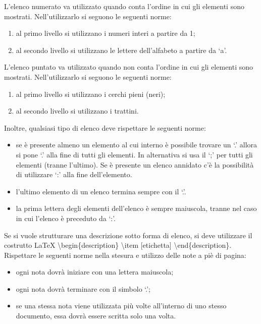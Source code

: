 					L’elenco numerato va utilizzato quando conta l’ordine in cui gli elementi sono mostrati. Nell’utilizzarlo si seguono le seguenti norme:
					\begin{enumerate}
						\item al primo livello si utilizzano i numeri interi a partire da 1;
						\item al secondo livello si utilizzano le lettere dell’alfabeto a partire da ‘a’.
					\end{enumerate}
					L’elenco puntato va utilizzato quando non conta l’ordine in cui gli elementi sono mostrati. Nell’utilizzarlo si seguono le seguenti norme:
					\begin{enumerate}
						\item al primo livello si utilizzano i cerchi pieni (neri);
						\item al secondo livello si utilizzano i trattini.
					\end{enumerate}
					Inoltre, qualsiasi tipo di elenco deve rispettare le seguenti norme:
					\begin{itemize}
						\item se è presente almeno un elemento al cui interno è possibile trovare un ‘.’ allora si pone ‘.’ alla fine di tutti gli elementi. In alternativa si usa il ‘;’ per tutti gli elementi (tranne l’ultimo). Se è presente un elenco annidato c’è la possibilità di utilizzare ‘:’ alla fine dell’elemento.
						\item l’ultimo elemento di un elenco termina sempre con il ‘.’.
						\item la prima lettera degli elementi dell’elenco è sempre maiuscola, tranne nel caso in cui l’elenco è preceduto da ‘:’.
					\end{itemize}
					Se si vuole strutturare una descrizione sotto forma di elenco, si deve utilizzare il costrutto \LaTeX{} \textbackslash begin\{description\} \textbackslash item [etichetta] \textbackslash end\{description\}.
					Rispettare le seguenti norme nella stesura e utilizzo delle note a piè di pagina:
					\begin{itemize}
						\item ogni nota dovrà iniziare con una lettera maiuscola;
						\item ogni nota dovrà terminare con il simbolo ‘.’;
						\item se una stessa nota viene utilizzata più volte all’interno di uno stesso documento, essa dovrà essere scritta solo una volta.
					\end{itemize}
